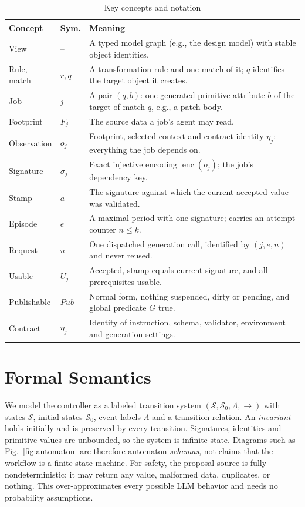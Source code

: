 \documentclass[10pt,journal,compsoc]{IEEEtran}
\theoremstyle{plain}
\theoremstyle{definition}
\newcommand{\Sig}{\sigma}
\begin{document}
\begin{table}[!t]
\centering
\caption{Key concepts and notation}\label{tab:glossary}
\footnotesize\setlength{\tabcolsep}{3pt}
\begin{tabular}{@{}>{\raggedright\arraybackslash}p{15mm}>{\raggedright\arraybackslash}p{8mm}>{\raggedright\arraybackslash}p{57mm}@{}}\toprule
Concept & Sym. & Meaning\\\midrule
View & -- & A typed model graph (e.g., the design model) with stable object identities.\\
Rule, match & $r,q$ & A transformation rule and one match of it; $q$ identifies the target object it creates.\\
Job & $j$ & A pair $(q,b)$: one generated primitive attribute $b$ of the target of match $q$, e.g., a patch body.\\
Footprint & $F_j$ & The source data a job's agent may read.\\
Observation & $o_j$ & Footprint, selected context and contract identity $\eta_j$: everything the job depends on.\\
Signature & $\Sig_j$ & Exact injective encoding $\operatorname{enc}(o_j)$; the job's dependency key.\\
Stamp & $a$ & The signature against which the current accepted value was validated.\\
Episode & $e$ & A maximal period with one signature; carries an attempt counter $n\le k$.\\
Request & $u$ & One dispatched generation call, identified by $(j,e,n)$ and never reused.\\
Usable & $U_j$ & Accepted, stamp equals current signature, and all prerequisites usable.\\
Publishable & $\mathit{Pub}$ & Normal form, nothing suspended, dirty or pending, and global predicate $G$ true.\\
Contract & $\eta_j$ & Identity of instruction, schema, validator, environment and generation settings.\\\bottomrule
\end{tabular}
\end{table}

\section{Formal Semantics}\label{sec:semantics}
We model the controller as a labeled transition system $(\mathcal S,\mathcal S_0,\Lambda,\to)$ with states $\mathcal S$, initial states $\mathcal S_0$, event labels $\Lambda$ and a transition relation. An \emph{invariant} holds initially and is preserved by every transition. Signatures, identities and primitive values are unbounded, so the system is infinite-state. Diagrams such as Fig.~\ref{fig:automaton} are therefore automaton \emph{schemas}, not claims that the workflow is a finite-state machine. For safety, the proposal source is fully nondeterministic: it may return any value, malformed data, duplicates, or nothing. This over-approximates every possible LLM behavior and needs no probability assumptions.
\end{document}
